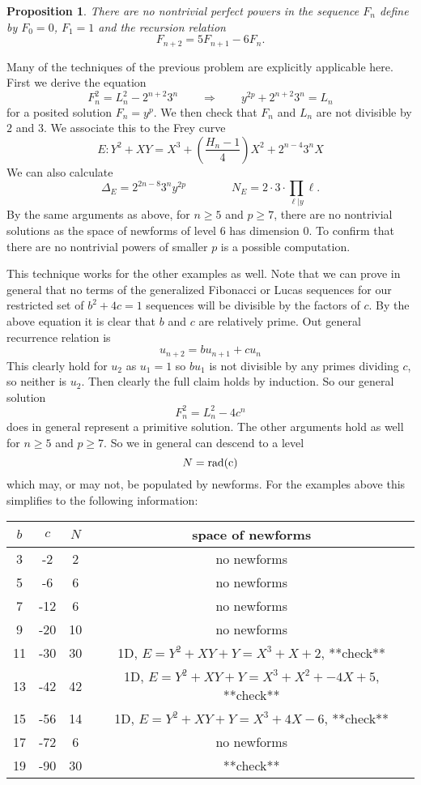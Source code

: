 \documentclass[12pt]{article}
\newtheorem{prop}[thm]{Proposition}
\newenvironment{proof}[1][Proof.]{\begin{trivlist}
\item[\hskip \labelsep {\bfseries #1}]}{\end{trivlist}}
\newcommand{\rad}{\rm rad}
\begin{document}
\begin{prop}
There are no nontrivial perfect powers in the sequence $F_n$ define by $F_0 = 0$, $F_1 = 1$ and the recursion relation
\[ F_{n+2} = 5F_{n+1}-6F_n. \]
\end{prop}

\begin{proof}
Many of the techniques of the previous problem are explicitly applicable here.  First we derive the equation
\[ F_n^2 = L_n^2 - 2^{n+2}3^n \qquad \Rightarrow \qquad y^{2p} + 2^{n+2}3^n = L_n\]
for a posited solution $F_n = y^p$.  We then check that $F_n$ and $L_n$ are not divisible by $2$ and $3$.  We associate this to the Frey curve
\[ E: Y^2 +XY = X^3 + \left(\frac{H_n-1}{4} \right)X^2 + 2^{n-4}3^nX \]
We can also calculate
\[ \Delta_E = 2^{2n-8}3^ny^{2p} \qquad \qquad N_E = 2 \cdot 3 \cdot \prod_{\ell | y} \ell .\]
By the same arguments as above, for $n \geq 5$ and $p \geq 7$, there are no nontrivial solutions as the space of newforms of level $6$ has dimension $0$.  To confirm that there are no nontrivial powers of smaller $p$ is a possible computation.
\end{proof}

This technique works for the other examples as well.  Note that we can prove in general that no terms of the generalized Fibonacci or Lucas sequences for our restricted set of $b^2+4c=1$ sequences will be divisible by the factors of $c$.  By the above equation it is clear that $b$ and $c$ are relatively prime.  Out general recurrence relation is
\[ u_{n+2} = bu_{n+1} +cu_n \]
This clearly hold for $u_2$ as $u_1=1$ so $bu_{1}$ is not divisible by any primes dividing $c$, so neither is $u_2$.  Then clearly the full claim holds by induction.  So our general solution
\[ F_n^2 = L_n^2 - 4c^n\]
does in general represent a primitive solution.  The other arguments hold as well for $n \geq 5$ and $p \geq 7$.  So we in general can descend to a level
\[ N = \rad(c) \]
which may, or may not, be populated by newforms.  For the examples above this simplifies to the following information:

\begin{center}
\begin{tabular}{ c c | c c}
$b$ & $c$ & $N$ & space of newforms  \\ \hline \hline
3 & -2 & 2 & no newforms \\
5 & -6 & 6 & no newforms\\
7 & -12 & 6 & no newforms\\
9 & -20 & 10 & no newforms\\
11 & -30 & 30 & 1D, $E = Y^2 +XY + Y = X^3+X+2$,  **check** \\
13 & -42 & 42 & 1D, $E = Y^2 +XY +Y = X^3 + X^2 +-4X+5$,   **check** \\
15 & -56 & 14& 1D, $E = Y^2 +XY+Y = X^3 +4X-6$,   **check**  \\
17 & -72 & 6 & no newforms \\
19 & -90 & 30 &  **check**
\end{tabular}
\end{center}
\end{document}
